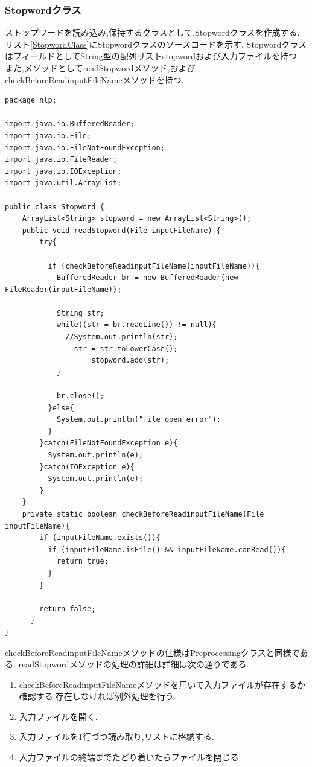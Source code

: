 \documentclass[a4j]{jarticle}
\begin{document}
\subsubsection{Stopwordクラス}
ストップワードを読み込み,保持するクラスとして,Stopwordクラスを作成する.
リスト\ref{StopwordClass}にStopwordクラスのソースコードを示す.
StopwordクラスはフィールドとしてString型の配列リストstopwordおよび入力ファイルを持つ.
また,メソッドとしてreadStopwordメソッド,およびcheckBeforeReadinputFileNameメソッドを持つ.
\begin{lstlisting}[basicstyle=\ttfamily\footnotesize, frame=single,label=StopwordClass,caption=Stopwordクラスのソースコード]
package nlp;

import java.io.BufferedReader;
import java.io.File;
import java.io.FileNotFoundException;
import java.io.FileReader;
import java.io.IOException;
import java.util.ArrayList;

public class Stopword {
	ArrayList<String> stopword = new ArrayList<String>();
    public void readStopword(File inputFileName) {
    	try{

  	      if (checkBeforeReadinputFileName(inputFileName)){
  	        BufferedReader br = new BufferedReader(new FileReader(inputFileName));

  	        String str;
  	        while((str = br.readLine()) != null){
  	          //System.out.println(str);
  	        	str = str.toLowerCase();
  	        		stopword.add(str);
  	        }

  	        br.close();
  	      }else{
  	        System.out.println("file open error");
  	      }
  	    }catch(FileNotFoundException e){
  	      System.out.println(e);
  	    }catch(IOException e){
  	      System.out.println(e);
  	    }
    }
    private static boolean checkBeforeReadinputFileName(File inputFileName){
        if (inputFileName.exists()){
          if (inputFileName.isFile() && inputFileName.canRead()){
            return true;
          }
        }

        return false;
      }
}
\end{lstlisting}
checkBeforeReadinputFileNameメソッドの仕様はPreprocessingクラスと同様である.
readStopwordメソッドの処理の詳細は詳細は次の通りである.
\begin{enumerate}
	\item checkBeforeReadinputFileNameメソッドを用いて入力ファイルが存在するか確認する.存在しなければ例外処理を行う.
	\item 入力ファイルを開く.
	\item 入力ファイルを1行づつ読み取り,リストに格納する.
	\item 入力ファイルの終端までたどり着いたらファイルを閉じる.
\end{enumerate}
\end{document}
